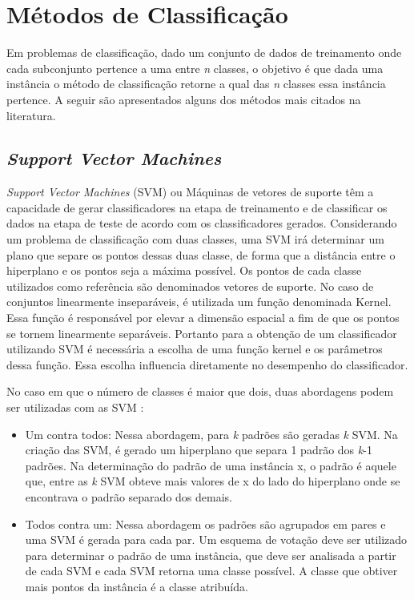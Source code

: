 \section{Métodos de Classificação}
Em problemas de classificação, dado um conjunto de dados de treinamento onde cada subconjunto pertence a uma entre \textit{n} classes, o objetivo é que dada uma instância o método de classificação retorne a qual das \textit{n} classes essa instância pertence. A seguir são apresentados alguns dos métodos mais citados na literatura. 

\subsection{\it Support Vector Machines}
\textit{Support Vector Machines} (SVM) ou Máquinas de vetores de suporte têm a capacidade de gerar classificadores na etapa de treinamento e de classificar os dados na etapa de teste de acordo com os classificadores gerados. Considerando um problema de classificação com duas classes, uma SVM irá determinar um plano que separe os pontos dessas duas classe, de forma que a distância entre o hiperplano e os pontos seja a máxima possível. Os pontos de cada classe utilizados como referência são denominados vetores de suporte.
No caso de conjuntos linearmente inseparáveis, é utilizada um função denominada Kernel. Essa função é responsável por elevar a dimensão espacial a fim de que os pontos se tornem linearmente separáveis. Portanto para a obtenção de um classificador utilizando SVM é necessária a escolha de uma função kernel e os parâmetros dessa função. Essa escolha influencia diretamente no desempenho do classificador\cite{Gunn98SVM}\cite{Reffson02SVM}.

No caso em que o número de classes é maior que dois, duas abordagens podem ser utilizadas com as SVM \cite{Lorena03SVM}:
\begin{itemize}
\item{Um contra todos: }Nessa abordagem, para \textit{k} padrões são geradas \textit{k} SVM. Na criação das SVM, é gerado um hiperplano que separa 1 padrão dos \textit{k}-1 padrões. Na determinação do padrão de uma instância x, o padrão é aquele que, entre as \textit{k} SVM obteve mais valores de x do lado do hiperplano onde se encontrava o padrão separado dos demais.  
\item{Todos contra um: }Nessa abordagem os padrões são agrupados em pares e uma SVM é gerada para cada par. Um esquema de votação deve ser utilizado para determinar o padrão de uma instância, que deve ser analisada a partir de cada SVM e cada SVM retorna uma classe possível. A classe que obtiver mais pontos da instância é a classe atribuída.
\end{itemize}

